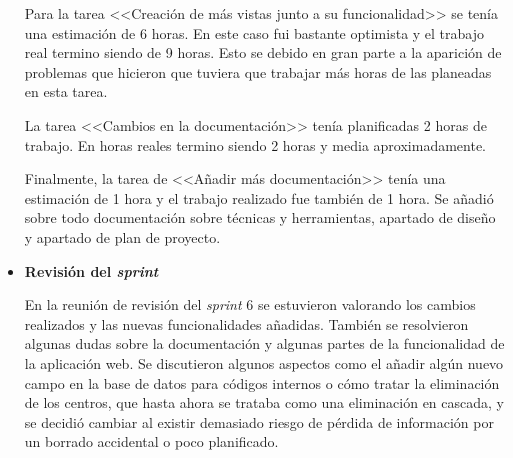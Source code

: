 \begin{itemize}
Para la tarea <<Creación de más vistas junto a su funcionalidad>> se tenía una estimación de 6 horas. 
En este caso fui bastante optimista y el trabajo real termino siendo de 9 horas.
Esto se debido en gran parte a la aparición de problemas que hicieron que tuviera que trabajar más horas de las planeadas en esta tarea.

La tarea <<Cambios en la documentación>> tenía planificadas 2 horas de trabajo. 
En horas reales termino siendo 2 horas y media aproximadamente.

Finalmente, la tarea de <<Añadir más documentación>> tenía una estimación de 1 hora y el trabajo realizado fue también de 1 hora. 
Se añadió sobre todo documentación sobre técnicas y herramientas, apartado de diseño y apartado de plan de proyecto.

\item\textbf{Revisión del \textit{sprint}}

En la reunión de revisión del \textit{sprint} 6 se estuvieron valorando los cambios realizados y las nuevas funcionalidades añadidas.
También se resolvieron algunas dudas sobre la documentación y algunas partes de la funcionalidad de la aplicación web.
Se discutieron algunos aspectos como el añadir algún nuevo campo en la base de datos para códigos internos o cómo tratar la eliminación de los centros, que hasta ahora se trataba como una eliminación en cascada, y se decidió cambiar al existir demasiado riesgo de pérdida de información por un borrado accidental o poco planificado.

\end{itemize}


